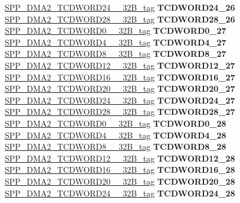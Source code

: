 \begin{DoxyCompactItemize}
\begin{tabbing}
\>\>\mbox{\hyperlink{unionSPP__DMA2__TCDWORD24____32B__tag}{SPP\_DMA2\_TCDWORD24\_\_32B\_tag}} {\bfseries TCDWORD24\_26}\\
\>\>\mbox{\hyperlink{unionSPP__DMA2__TCDWORD28____32B__tag}{SPP\_DMA2\_TCDWORD28\_\_32B\_tag}} {\bfseries TCDWORD28\_26}\\
\>\>\mbox{\hyperlink{unionSPP__DMA2__TCDWORD0____32B__tag}{SPP\_DMA2\_TCDWORD0\_\_32B\_tag}} {\bfseries TCDWORD0\_27}\\
\>\>\mbox{\hyperlink{unionSPP__DMA2__TCDWORD4____32B__tag}{SPP\_DMA2\_TCDWORD4\_\_32B\_tag}} {\bfseries TCDWORD4\_27}\\
\>\>\mbox{\hyperlink{unionSPP__DMA2__TCDWORD8____32B__tag}{SPP\_DMA2\_TCDWORD8\_\_32B\_tag}} {\bfseries TCDWORD8\_27}\\
\>\>\mbox{\hyperlink{unionSPP__DMA2__TCDWORD12____32B__tag}{SPP\_DMA2\_TCDWORD12\_\_32B\_tag}} {\bfseries TCDWORD12\_27}\\
\>\>\mbox{\hyperlink{unionSPP__DMA2__TCDWORD16____32B__tag}{SPP\_DMA2\_TCDWORD16\_\_32B\_tag}} {\bfseries TCDWORD16\_27}\\
\>\>\mbox{\hyperlink{unionSPP__DMA2__TCDWORD20____32B__tag}{SPP\_DMA2\_TCDWORD20\_\_32B\_tag}} {\bfseries TCDWORD20\_27}\\
\>\>\mbox{\hyperlink{unionSPP__DMA2__TCDWORD24____32B__tag}{SPP\_DMA2\_TCDWORD24\_\_32B\_tag}} {\bfseries TCDWORD24\_27}\\
\>\>\mbox{\hyperlink{unionSPP__DMA2__TCDWORD28____32B__tag}{SPP\_DMA2\_TCDWORD28\_\_32B\_tag}} {\bfseries TCDWORD28\_27}\\
\>\>\mbox{\hyperlink{unionSPP__DMA2__TCDWORD0____32B__tag}{SPP\_DMA2\_TCDWORD0\_\_32B\_tag}} {\bfseries TCDWORD0\_28}\\
\>\>\mbox{\hyperlink{unionSPP__DMA2__TCDWORD4____32B__tag}{SPP\_DMA2\_TCDWORD4\_\_32B\_tag}} {\bfseries TCDWORD4\_28}\\
\>\>\mbox{\hyperlink{unionSPP__DMA2__TCDWORD8____32B__tag}{SPP\_DMA2\_TCDWORD8\_\_32B\_tag}} {\bfseries TCDWORD8\_28}\\
\>\>\mbox{\hyperlink{unionSPP__DMA2__TCDWORD12____32B__tag}{SPP\_DMA2\_TCDWORD12\_\_32B\_tag}} {\bfseries TCDWORD12\_28}\\
\>\>\mbox{\hyperlink{unionSPP__DMA2__TCDWORD16____32B__tag}{SPP\_DMA2\_TCDWORD16\_\_32B\_tag}} {\bfseries TCDWORD16\_28}\\
\>\>\mbox{\hyperlink{unionSPP__DMA2__TCDWORD20____32B__tag}{SPP\_DMA2\_TCDWORD20\_\_32B\_tag}} {\bfseries TCDWORD20\_28}\\
\>\>\mbox{\hyperlink{unionSPP__DMA2__TCDWORD24____32B__tag}{SPP\_DMA2\_TCDWORD24\_\_32B\_tag}} {\bfseries TCDWORD24\_28}\\

\end{tabbing}
\end{DoxyCompactItemize}
